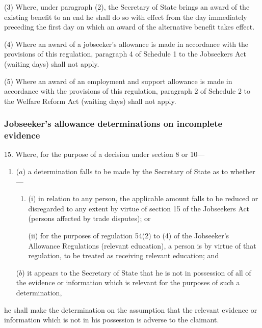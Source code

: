 \documentclass[12pt,a4paper]{article}
\begin{document}
(3) Where, under paragraph (2), the Secretary of State brings an award of the existing benefit to an end he shall do so with effect from the day immediately preceding the first day on which an award of the alternative benefit takes effect.

(4) Where an award of a jobseeker’s allowance is made in accordance with the provisions of this regulation, paragraph 4 of Schedule 1 to the Jobseekers Act (waiting days) shall not apply.

(5) Where an award of an employment and support allowance is made in accordance with the provisions of this regulation, paragraph 2 of Schedule 2 to the Welfare Reform Act (waiting days) shall not apply.


\subsubsection[15. Jobseeker’s allowance determinations on incomplete evidence]{Jobseeker’s allowance determinations on incomplete evidence}

15.  Where, for the purpose of a decision under section 8 or 10—
\begin{enumerate}\item[]
($a$) a determination falls to be made by the Secretary of State as to whether—
\begin{enumerate}\item[]
(i) in relation to any person, the applicable amount falls to be reduced or disregarded to any extent by virtue of section 15 of the Jobseekers Act (persons affected by trade disputes); or

(ii) for the purposes of regulation 54(2) to (4) of the Jobseeker’s Allowance Regulations (relevant education), a person is by virtue of that regulation, to be treated as receiving relevant education; and
\end{enumerate}

($b$) it appears to the Secretary of State that he is not in possession of all of the evidence or information which is relevant for the purposes of such a determination,
\end{enumerate}
he shall make the determination on the assumption that the relevant evidence or information which is not in his possession is adverse to the claimant.
\end{document}
